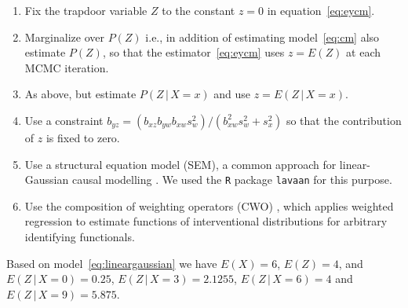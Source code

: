 \documentclass{statsoc}
\newcommand{\+}[1]{\ensuremath{\mathbf{#1}}}
\newcommand{\given}{{ \, | \, }}
\begin{document}
\begin{enumerate}
\item Fix the trapdoor variable $Z$ to the constant $z=0$ in equation~\eqref{eq:eycm}.
\item Marginalize over $P(Z)$ i.e., in addition of estimating model~\eqref{eq:cm} also estimate $P(Z)$, so that the estimator~\eqref{eq:eycm} uses $z = E(Z)$ at each MCMC iteration.
\item As above, but estimate $P(Z \given  X = x)$ and use $z = E(Z \given X = x)$.
\item Use a constraint $b_{yz} = (b_{xz}b_{yw} b_{xw} s_w^2)/(b_{xw}^2 s_w^2+s_x^2)$ so that the contribution of $z$ is fixed to zero.
\item Use a structural equation model (SEM), a common approach for linear-Gaussian causal modelling \citep{Kline2011}. We used the \texttt{R} package \texttt{lavaan} \citep{lavaan} for this purpose.
\item Use the composition of weighting operators (CWO) \citep{jung2020}, which applies weighted regression to estimate functions of interventional distributions for arbitrary identifying functionals.
\end{enumerate}
Based on model~\eqref{eq:lineargaussian} we have $E(X) = 6$, $E(Z) = 4$, and $E(Z \given  X = 0) = 0.25$, $E(Z \given  X =3) = 2.1255$, $E(Z \given  X =6) = 4$ and $E(Z \given  X =9) = 5.875$. 
\end{document}
